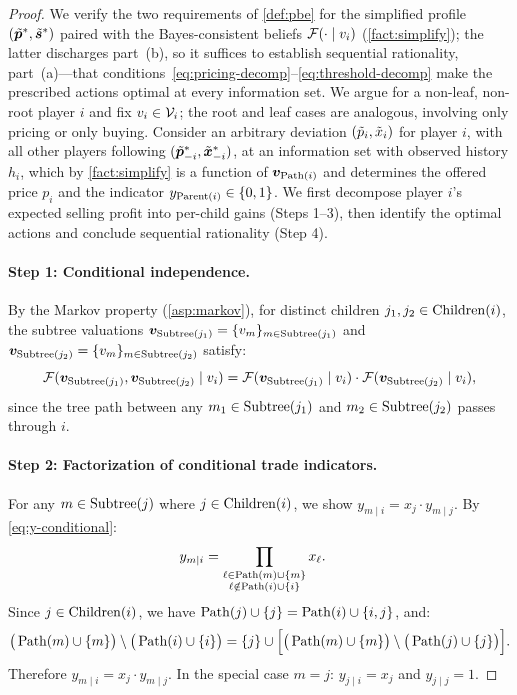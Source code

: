 \begin{proof}
We verify the two requirements of \cref{def:pbe} for the simplified profile $(\tilde{{\bm{p}}}^*, \tilde{{\bm{s}}}^*)$ paired with the Bayes-consistent beliefs $\mathcal{F}(\cdot \mid v_i)$ (\cref{fact:simplify}); the latter discharges part~(b), so it suffices to establish sequential rationality, part~(a)---that conditions~\eqref{eq:pricing-decomp}--\eqref{eq:threshold-decomp} make the prescribed actions optimal at every information set. We argue for a non-leaf, non-root player $i$ and fix $v_i \in \mathcal{V}_i$; the root and leaf cases are analogous, involving only pricing or only buying. Consider an arbitrary deviation $(\tilde{p}_i, \tilde{x}_i)$ for player $i$, with all other players following $(\tilde{{\bm{p}}}^*_{-i}, \tilde{{\bm{x}}}^*_{-i})$, at an information set with observed history $h_i$, which by \cref{fact:simplify} is a function of ${\bm{v}}_{\operatorname{Path}(i)}$ and determines the offered price $p_i$ and the indicator $y_{\operatorname{Parent}(i)} \in \{0,1\}$. We first decompose player $i$'s expected selling profit into per-child gains (Steps 1--3), then identify the optimal actions and conclude sequential rationality (Step 4).

\paragraph{Step 1: Conditional independence.}
By the Markov property (\cref{asp:markov}), for distinct children $j_1, j_2 \in \operatorname{Children}(i)$, the subtree valuations ${\bm{v}}_{\operatorname{Subtree}(j_1)} = \{v_m\}_{m \in \operatorname{Subtree}(j_1)}$ and ${\bm{v}}_{\operatorname{Subtree}(j_2)} = \{v_m\}_{m \in \operatorname{Subtree}(j_2)}$ satisfy:
\[
\mathcal{F}({\bm{v}}_{\operatorname{Subtree}(j_1)}, {\bm{v}}_{\operatorname{Subtree}(j_2)} \mid v_i) = \mathcal{F}({\bm{v}}_{\operatorname{Subtree}(j_1)} \mid v_i) \cdot \mathcal{F}({\bm{v}}_{\operatorname{Subtree}(j_2)} \mid v_i),
\]
since the tree path between any $m_1 \in \operatorname{Subtree}(j_1)$ and $m_2 \in \operatorname{Subtree}(j_2)$ passes through $i$.

\paragraph{Step 2: Factorization of conditional trade indicators.}
For any $m \in \operatorname{Subtree}(j)$ where $j \in \operatorname{Children}(i)$, we show $y_{m \mid i} = x_j \cdot y_{m \mid j}$. By \cref{eq:y-conditional}:
\begin{align*}
y_{m \mid i} &= \prod_{\substack{\ell \in \operatorname{Path}(m) \cup \{m\} \\ \ell \notin \operatorname{Path}(i) \cup \{i\}}} x_\ell.
\end{align*}
Since $j \in \operatorname{Children}(i)$, we have $\operatorname{Path}(j) \cup \{j\} = \operatorname{Path}(i) \cup \{i,j\}$, and:
\[
\big(\operatorname{Path}(m) \cup \{m\}\big) \setminus \big(\operatorname{Path}(i) \cup \{i\}\big) = \{j\} \cup \Big[\big(\operatorname{Path}(m) \cup \{m\}\big) \setminus \big(\operatorname{Path}(j) \cup \{j\}\big)\Big].
\]
Therefore $y_{m \mid i} = x_j \cdot y_{m \mid j}$. In the special case $m = j$: $y_{j \mid i} = x_j$ and $y_{j \mid j} = 1$.


\end{proof}
